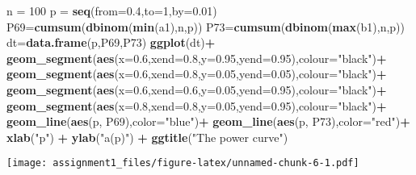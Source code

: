 \documentclass[
]{article}
\newenvironment{Shaded}{\begin{snugshade}}{\end{snugshade}}
\newcommand{\DataTypeTok}[1]{\textcolor[rgb]{0.13,0.29,0.53}{#1}}
\newcommand{\DecValTok}[1]{\textcolor[rgb]{0.00,0.00,0.81}{#1}}
\newcommand{\FloatTok}[1]{\textcolor[rgb]{0.00,0.00,0.81}{#1}}
\newcommand{\KeywordTok}[1]{\textcolor[rgb]{0.13,0.29,0.53}{\textbf{#1}}}
\newcommand{\NormalTok}[1]{#1}
\newcommand{\OperatorTok}[1]{\textcolor[rgb]{0.81,0.36,0.00}{\textbf{#1}}}
\newcommand{\StringTok}[1]{\textcolor[rgb]{0.31,0.60,0.02}{#1}}
\begin{document}
\begin{Shaded}
\begin{Highlighting}[]
\NormalTok{n =}\StringTok{ }\DecValTok{100}
\NormalTok{p =}\StringTok{ }\KeywordTok{seq}\NormalTok{(}\DataTypeTok{from=}\FloatTok{0.4}\NormalTok{,}\DataTypeTok{to=}\DecValTok{1}\NormalTok{,}\DataTypeTok{by=}\FloatTok{0.01}\NormalTok{)}
\NormalTok{P69=}\KeywordTok{cumsum}\NormalTok{(}\KeywordTok{dbinom}\NormalTok{(}\KeywordTok{min}\NormalTok{(a1),n,p))}
\NormalTok{P73=}\KeywordTok{cumsum}\NormalTok{(}\KeywordTok{dbinom}\NormalTok{(}\KeywordTok{max}\NormalTok{(b1),n,p))}
\NormalTok{dt=}\KeywordTok{data.frame}\NormalTok{(p,P69,P73)}
\KeywordTok{ggplot}\NormalTok{(dt)}\OperatorTok{+}
\StringTok{  }\KeywordTok{geom_segment}\NormalTok{(}\KeywordTok{aes}\NormalTok{(}\DataTypeTok{x=}\FloatTok{0.6}\NormalTok{,}\DataTypeTok{xend=}\FloatTok{0.8}\NormalTok{,}\DataTypeTok{y=}\FloatTok{0.95}\NormalTok{,}\DataTypeTok{yend=}\FloatTok{0.95}\NormalTok{),}\DataTypeTok{colour=}\StringTok{"black"}\NormalTok{)}\OperatorTok{+}
\StringTok{  }\KeywordTok{geom_segment}\NormalTok{(}\KeywordTok{aes}\NormalTok{(}\DataTypeTok{x=}\FloatTok{0.6}\NormalTok{,}\DataTypeTok{xend=}\FloatTok{0.8}\NormalTok{,}\DataTypeTok{y=}\FloatTok{0.05}\NormalTok{,}\DataTypeTok{yend=}\FloatTok{0.05}\NormalTok{),}\DataTypeTok{colour=}\StringTok{"black"}\NormalTok{)}\OperatorTok{+}
\StringTok{  }\KeywordTok{geom_segment}\NormalTok{(}\KeywordTok{aes}\NormalTok{(}\DataTypeTok{x=}\FloatTok{0.6}\NormalTok{,}\DataTypeTok{xend=}\FloatTok{0.6}\NormalTok{,}\DataTypeTok{y=}\FloatTok{0.05}\NormalTok{,}\DataTypeTok{yend=}\FloatTok{0.95}\NormalTok{),}\DataTypeTok{colour=}\StringTok{"black"}\NormalTok{)}\OperatorTok{+}
\StringTok{  }\KeywordTok{geom_segment}\NormalTok{(}\KeywordTok{aes}\NormalTok{(}\DataTypeTok{x=}\FloatTok{0.8}\NormalTok{,}\DataTypeTok{xend=}\FloatTok{0.8}\NormalTok{,}\DataTypeTok{y=}\FloatTok{0.05}\NormalTok{,}\DataTypeTok{yend=}\FloatTok{0.95}\NormalTok{),}\DataTypeTok{colour=}\StringTok{"black"}\NormalTok{)}\OperatorTok{+}
\StringTok{  }\KeywordTok{geom_line}\NormalTok{(}\KeywordTok{aes}\NormalTok{(p, P69),}\DataTypeTok{color=}\StringTok{"blue"}\NormalTok{)}\OperatorTok{+}
\StringTok{  }\KeywordTok{geom_line}\NormalTok{(}\KeywordTok{aes}\NormalTok{(p, P73),}\DataTypeTok{color=}\StringTok{"red"}\NormalTok{)}\OperatorTok{+}
\StringTok{  }\KeywordTok{xlab}\NormalTok{(}\StringTok{"p"}\NormalTok{) }\OperatorTok{+}
\StringTok{  }\KeywordTok{ylab}\NormalTok{(}\StringTok{"a(p)"}\NormalTok{) }\OperatorTok{+}
\StringTok{  }\KeywordTok{ggtitle}\NormalTok{(}\StringTok{"The power curve"}\NormalTok{) }
\end{Highlighting}
\end{Shaded}

\texttt{[image: assignment1\_files/figure-latex/unnamed-chunk-6-1.pdf]}

\hypertarget{section}{%
\section{}\label{section}}
\end{document}
